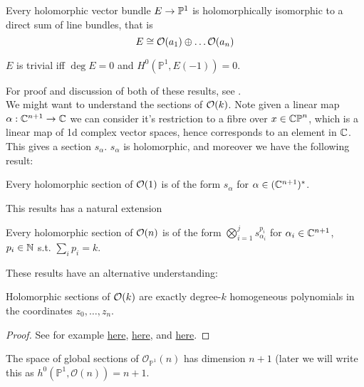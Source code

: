 \documentclass{article}
\begin{document}
\begin{theorem}
	Every holomorphic vector bundle $E \to \mathbb{P}^1$ is holomorphically isomorphic to a direct sum of line bundles, that is 
	\[
	E \cong \mathcal{O}(a_1) \oplus \dots \mathcal{O}(a_n)
	\]
\end{theorem}
\begin{corollary}
	$E$ is trivial iff $\deg E=0$ and $H^0(\mathbb{P}^1,E(-1))=0$. 
\end{corollary}
For proof and discussion of both of these results, see \cite{Hitchin1999}. \\
We might want to understand the sections of $\mathcal{O}(k)$. Note given a linear map $\alpha :\mathbb{C}^{n+1} \to \mathbb{C}$ we can consider it's restriction to a fibre over $x \in \mathbb{CP}^n$, which is a linear map of 1d complex vector spaces, hence corresponds to an element in $\mathbb{C}$. This gives a section $s_\alpha$. $s_\alpha$ is holomorphic, and moreover we have the following result:
\begin{prop}
	Every holomorphic section of $\mathcal{O}(1)$ is of the form $s_\alpha$ for $\alpha \in (\mathbb{C}^{n+1})^\ast$. 
\end{prop}  
This results has a natural extension 
\begin{prop}
	Every holomorphic section of $\mathcal{O}(n)$ is of the form $\bigotimes_{i=1}^j s_{\alpha_i}^{p_i}$ for $\alpha_i \in \mathbb{C}^{n+1}$, $p_i \in \mathbb{N}$ s.t. $\sum_i p_i = k$. 
\end{prop}
These results have an alternative understanding:
\begin{prop}
	Holomorphic sections of $\mathcal{O}(k)$ are exactly degree-$k$ homogeneous polynomials in the coordinates $z_0, \dots, z_n$. 
\end{prop}
\begin{proof}
	See for example \href{http://math.iisc.ac.in/~vamsipingali/teaching/AIS2019Lecture1.pdf}{here}, \href{https://math.stanford.edu/~vakil/725/class22.pdf}{here}, and \href{http://homepages.ulb.ac.be/~joelfine/preprints/Kahler_intro_ch2.pdf}{here}.
\end{proof}
\begin{corollary}\label{cor: h^0(P^1,O(n))=n+1}
	The space of global sections of $\mathcal{O}_{\mathbb{P}^1}(n)$ has dimension $n+1$ (later we will write this as $h^0(\mathbb{P}^1,\mathcal{O}(n))=n+1$.
\end{corollary}
\end{document}
